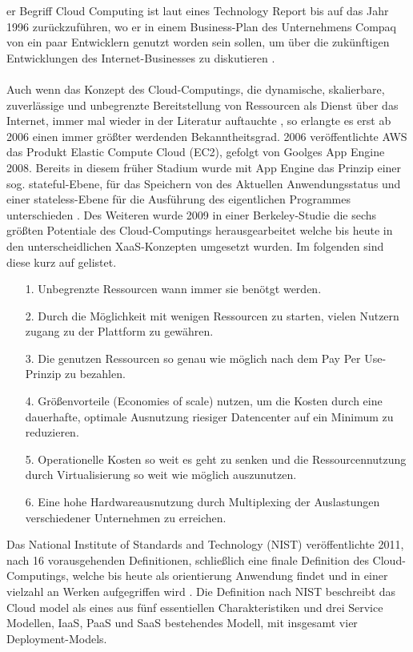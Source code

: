 er Begriff Cloud Computing ist laut eines Technology Report bis auf das Jahr 1996 zurückzuführen, wo er in einem Business-Plan des Unternehmens Compaq von ein paar Entwicklern genutzt worden sein sollen, um über die zukünftigen Entwicklungen des Internet-Businesses zu diskutieren \cite{regalado2011coined}.\\\\ 
Auch wenn das Konzept des Cloud-Computings, die dynamische, skalierbare, zuverlässige und unbegrenzte Bereitstellung von Ressourcen als Dienst über das Internet, immer mal wieder in der Literatur auftauchte \cite{fox2009above}, so erlangte es erst ab 2006 einen immer größter werdenden Bekanntheitsgrad. 2006 veröffentlichte AWS das Produkt Elastic Compute Cloud (EC2), gefolgt von Goolges App Engine 2008. Bereits in diesem früher Stadium wurde mit App Engine das Prinzip einer sog. \glqq stateful\grqq{}-Ebene, für das Speichern von des Aktuellen Anwendungsstatus und einer \glqq stateless\grqq{}-Ebene für die Ausführung des eigentlichen Programmes unterschieden \cite{fox2009above}. Des Weiteren wurde 2009 in einer Berkeley-Studie die sechs größten Potentiale des Cloud-Computings herausgearbeitet welche bis heute in den unterscheidlichen XaaS-Konzepten umgesetzt wurden. Im folgenden sind diese kurz auf gelistet. \\
\begin{itemize}
\item[1.] Unbegrenzte Ressourcen wann immer sie benötgt werden. 
\item[2.] Durch die Möglichkeit mit wenigen Ressourcen zu starten, vielen Nutzern zugang zu der Plattform zu gewähren. 
\item[3.] Die genutzen Ressourcen so genau wie möglich nach dem \glqq Pay Per Use\grqq{}-Prinzip zu bezahlen. 
\item[4.] Größenvorteile (Economies of scale) nutzen, um die Kosten durch eine dauerhafte, optimale Ausnutzung riesiger Datencenter auf ein Minimum zu reduzieren. 
\item[5.] Operationelle Kosten so weit es geht zu senken und die Ressourcennutzung durch Virtualisierung so weit wie möglich auszunutzen. 
\item[6.] Eine hohe Hardwareausnutzung durch \glqq Multiplexing\grqq{} der Auslastungen verschiedener Unternehmen zu erreichen.
\end{itemize}
Das National Institute of Standards and Technology (NIST) veröffentlichte 2011, nach 16 vorausgehenden Definitionen, schließlich eine finale Definition des Cloud-Computings, welche bis heute als orientierung Anwendung findet und in einer vielzahl an Werken aufgegriffen wird \cite{mell2011nist}. Die Definition nach NIST beschreibt das Cloud model als eines aus fünf essentiellen Charakteristiken und drei Service Modellen, IaaS, PaaS und SaaS bestehendes Modell, mit insgesamt vier Deployment-Models.\\\\ 
